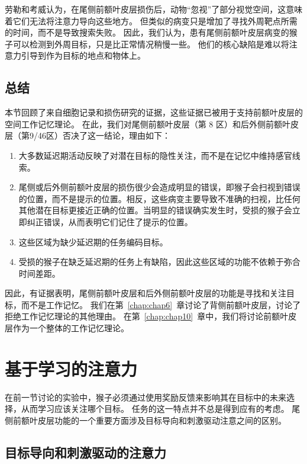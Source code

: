 劳勒和考威\cite{lawler1987role}认为，在尾侧前额叶皮层损伤后，动物“忽视”了部分视觉空间，这意味着它们无法将注意力导向这些地方。
但类似的病变只是增加了寻找外周靶点所需的时间，而不是导致搜索失败\cite{wardak2004deficit}。
因此，我们认为，患有尾侧前额叶皮层病变的猴子可以检测到外周目标，只是比正常情况稍慢一些。
他们的核心缺陷是难以将注意力引导到作为目标的地点和物体上。



\subsection{总结}

本节回顾了来自细胞记录和损伤研究的证据，这些证据已被用于支持前额叶皮层的空间工作记忆理论\cite{goldman1996prefrontal}。
在此，我们对尾侧前额叶皮层（第 8 区）和后外侧前额叶皮层（第9/46区）否决了这一结论，理由如下：


\begin{enumerate}
	\item 大多数延迟期活动反映了对潜在目标的隐性关注，而不是在记忆中维持感官线索。
	\item 尾侧或后外侧前额叶皮层的损伤很少会造成明显的错误，即猴子会扫视到错误的位置，而不是提示的位置。相反，这些病变主要导致不准确的扫视，比任何其他潜在目标更接近正确的位置。当明显的错误确实发生时，受损的猴子会立即纠正错误，从而表明它们记住了提示的位置。
	\item 这些区域为缺少延迟期的任务编码目标。
	\item 受损的猴子在缺乏延迟期的任务上有缺陷，因此这些区域的功能不依赖于弥合时间差距。
\end{enumerate}


因此，有证据表明，尾侧前额叶皮层和后外侧前额叶皮层的功能是寻找和关注目标，而不是工作记忆。
我们在第~\ref{chap:chap6}~章讨论了背侧前额叶皮层，讨论了拒绝工作记忆理论的其他理由。
在第~\ref{chap:chap10}~章中，我们将讨论前额叶皮层作为一个整体的工作记忆理论。



\section{基于学习的注意力}

在前一节讨论的实验中，猴子必须通过使用奖励反馈来影响其在目标中的未来选择，从而学习应该关注哪个目标。
任务的这一特点并不总是得到应有的考虑。
尾侧前额叶皮层功能的一个重要方面涉及目标导向和刺激驱动注意之间的区别。


\subsection{目标导向和刺激驱动的注意力}

